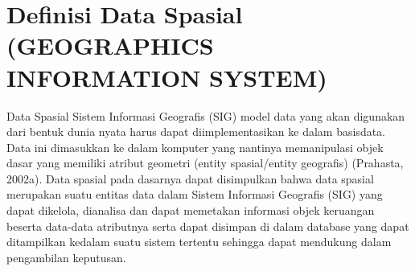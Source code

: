 \section{Definisi Data Spasial (GEOGRAPHICS INFORMATION SYSTEM)}
Data Spasial Sistem Informasi Geografis (SIG) model data yang akan digunakan dari bentuk dunia nyata harus dapat diimplementasikan ke dalam basisdata. Data ini dimasukkan ke dalam komputer yang nantinya memanipulasi objek dasar yang memiliki atribut geometri (entity spasial/entity geografis) 
(Prahasta, 2002a). Data spasial pada dasarnya dapat disimpulkan bahwa data spasial merupakan suatu entitas data dalam Sistem Informasi Geografis (SIG) yang dapat dikelola, dianalisa dan dapat memetakan informasi objek keruangan beserta data-data atributnya serta dapat disimpan di dalam database yang dapat ditampilkan kedalam suatu sistem tertentu sehingga dapat mendukung dalam pengambilan keputusan. 

